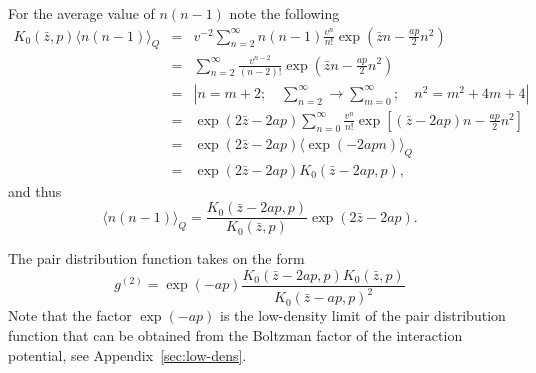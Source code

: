 For the average value of $n(n-1)$ note the following
\begin{eqnarray*}
	K_0(\bar{z}, p) \langle n(n-1) \rangle_Q & = & 
	v^{-2} \sum_{n=2}^{\infty} n(n-1) \frac{v^n}{n!} \exp(\bar{z}n - \frac{ap}{2}n^2)
	\\
	& = & \sum_{n=2}^{\infty} \frac{v^{n-2}}{(n-2)!} \exp(\bar{z}n - \frac{ap}{2}n^2)
	\\
	& = & \left| n=m+2; \quad \sum_{n=2}^{\infty} \rightarrow \sum_{m=0}^{\infty}; \quad n^2 = m^2 + 4m +4 \right|
	\\
	& = & \exp(2\bar{z} - 2ap) \sum_{n=0}^{\infty} \frac{v^n}{n!} \exp\left[(\bar{z} - 2ap)n - \frac{ap}{2}n^2 \right]
	\\
	& = & \exp(2\bar{z} - 2ap) \langle \exp(-2apn) \rangle_Q
	\\
	& = & \exp(2\bar{z} - 2ap) K_0(\bar{z} - 2ap, p),
\end{eqnarray*}
and thus
\begin{equation*}
	\langle n(n-1) \rangle_Q = \frac{K_0(\bar{z} - 2ap, p)}{K_0(\bar{z}, p)} \exp(2\bar{z} - 2ap).
\end{equation*}

The pair distribution function takes on the form
\begin{equation}
	g^{(2)} = \exp(-ap) \frac{K_0(\bar{z} - 2ap, p) K_0(\bar{z}, p)}{K_0(\bar{z}-ap, p)^2}
\end{equation}
Note that the factor $\exp(-ap)$ is the low-density limit of the pair distribution function that can be obtained from the Boltzman factor of the interaction potential, see Appendix~\ref{sec:low-dens}.


